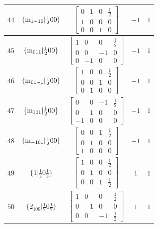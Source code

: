 \documentclass[fleqn,8pt]{jsarticle}
\begin{document}
\begin{longtable}{ccccc}
$ 44 $ & $ \{{\rm m}_{1-10}|\frac{1}{2} 0 0\} $ & $ \begin{bmatrix} 0 & 1 & 0 & \frac{1}{2} \\ 1 & 0 & 0 & 0 \\ 0 & 0 & 1 & 0 \end{bmatrix} $ & $ -1 $ & $ 1 $ \\ \hline
$ 45 $ & $ \{{\rm m}_{011}|\frac{1}{2} 0 0\} $ & $ \begin{bmatrix} 1 & 0 & 0 & \frac{1}{2} \\ 0 & 0 & -1 & 0 \\ 0 & -1 & 0 & 0 \end{bmatrix} $ & $ -1 $ & $ 1 $ \\ \hline
$ 46 $ & $ \{{\rm m}_{01-1}|\frac{1}{2} 0 0\} $ & $ \begin{bmatrix} 1 & 0 & 0 & \frac{1}{2} \\ 0 & 0 & 1 & 0 \\ 0 & 1 & 0 & 0 \end{bmatrix} $ & $ -1 $ & $ 1 $ \\ \hline
$ 47 $ & $ \{{\rm m}_{101}|\frac{1}{2} 0 0\} $ & $ \begin{bmatrix} 0 & 0 & -1 & \frac{1}{2} \\ 0 & 1 & 0 & 0 \\ -1 & 0 & 0 & 0 \end{bmatrix} $ & $ -1 $ & $ 1 $ \\ \hline
$ 48 $ & $ \{{\rm m}_{-101}|\frac{1}{2} 0 0\} $ & $ \begin{bmatrix} 0 & 0 & 1 & \frac{1}{2} \\ 0 & 1 & 0 & 0 \\ 1 & 0 & 0 & 0 \end{bmatrix} $ & $ -1 $ & $ 1 $ \\ \hline
$ 49 $ & $ \{1|\frac{1}{2} 0 \frac{1}{2}\} $ & $ \begin{bmatrix} 1 & 0 & 0 & \frac{1}{2} \\ 0 & 1 & 0 & 0 \\ 0 & 0 & 1 & \frac{1}{2} \end{bmatrix} $ & $ 1 $ & $ 1 $ \\ \hline
$ 50 $ & $ \{2{}_{100}|\frac{1}{2} 0 \frac{1}{2}\} $ & $ \begin{bmatrix} 1 & 0 & 0 & \frac{1}{2} \\ 0 & -1 & 0 & 0 \\ 0 & 0 & -1 & \frac{1}{2} \end{bmatrix} $ & $ 1 $ & $ 1 $ \\ \hline

\end{longtable}
\end{document}
